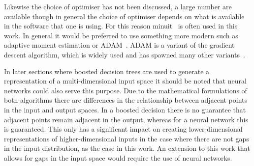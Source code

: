 Likewise the choice of optimiser has not been discussed, a large number are
available though in general the choice of optimiser depends on what is available
in the software that one is using. For this reason minuit~\cite{minuit} is often
used in this work. In general it would be preferred to use something more
modern such as adaptive moment estimation or ADAM~\cite{ADAMOpt}. ADAM is a
variant of the gradient descent algorithm, which is widely used and has spawned
many other variants~\cite{GDOverview}.

In later sections where boosted decision trees are used to generate a
representation of a multi-dimensional input space it should be noted that neural
networks could also serve this purpose. Due to the mathematical formulations of
both algorithms there are differences in the relationship between adjacent
points in the input and output spaces. In a boosted decision there is no
guarantee that adjacent points remain adjacent in the output, whereas for a
neural network this is guaranteed. This only has a significant impact on creating
lower-dimensional representations of higher-dimensional inputs in the case where
there are not gaps in the input distribution, as the case in this work. An
extension to this work that allows for gaps in the input space would require the
use of neural networks.